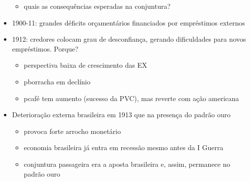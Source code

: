 \documentclass[a4paper,12pt]{article}[abntex2]
\begin{document}
\begin{itemize}
\begin{itemize}
    \item quais as consequências esperadas na conjuntura?
\end{itemize}
\item 1900-11: grandes déficits orçamentários financiados por empréstimos externos
\item 1912: credores colocam grau de desconfiança, gerando dificuldades para novos empréstimos. Porque?
\begin{itemize}
    \item perspectiva baixa de crescimento das EX
\end{itemize}
\begin{itemize}
    \item pborracha em declínio
\end{itemize}
\begin{itemize}
    \item pcafé tem aumento (sucesso da PVC), mas reverte com ação americana
\end{itemize}
\item Deterioração externa brasileira em 1913 que na presença do padrão ouro
\begin{itemize}
    \item provoca forte arrocho monetário
\end{itemize}
\begin{itemize}
    \item economia brasileira já entra em recessão mesmo antes da I Guerra
\end{itemize}
\begin{itemize}
    \item  conjuntura passageira era a aposta brasileira e, assim, permanece no padrão ouro
\end{itemize}
\end{itemize}
\end{document}
